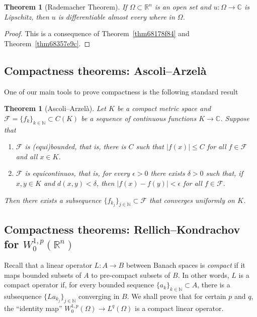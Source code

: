 \documentclass[a4paper,9pt]{amsart}
\newcommand{\scr}[1]{\mathscr{#1}}
\newcommand{\N}{\mathbb{N}}	%
\newcommand{\R}{\mathbb{R}}	%
\newcommand{\C}{\mathbb{C}}	%
\theoremstyle{plain}
\newtheorem{theorem}[proposition]{Theorem}
\theoremstyle{definition}
\theoremstyle{remark}
\begin{document}
\begin{theorem}[Rademacher Theorem]
	If $\Omega\subset\R^n$ is an open set and $u:\Omega\to\C$ is Lipschitz,
	then $u$ is differentiable almost every where in $\Omega$.
\end{theorem}
\begin{proof}
	This is a consequence of Theorem~\ref{thm68178f84} and Theorem~\ref{thm68357e9c}.
\end{proof}


\subsection{Compactness theorems: Ascoli--Arzelà}
One of our main tools to prove compactness is the following standard result
\begin{theorem}[Ascoli--Arzelà]\label{thm681f9a96}
	Let $K$ be a compact metric space and $\scr F = \{f_k\}_{k\in\N}\subset C(K)$ be a sequence of continuous functions $K\to\C$.
	Suppose that
	\begin{enumerate}
	\item
	$\scr F$ is (equi)bounded, that is, there is $C$ such that $|f(x)| \le C$ for all $f\in\scr F$ and all $x\in K$.
	\item
	$\scr F$ is equicontinuos, that is, for every $\epsilon>0$ there exists $\delta>0$ such that, if $x,y\in K$ and $d(x,y)<\delta$, then $|f(x)-f(y)|<\epsilon$ for all $f\in\scr F$.
	\end{enumerate}
	Then there exists a subsequence $\{f_{k_j}\}_{j\in\N}\subset\scr F$ that converges uniformly on $K$.
\end{theorem}

\subsection{Compactness theorems: Rellich--Kondrachov for $W^{1,p}_0(\R^n)$}

Recall that a linear operator $L:A\to B$ between Banach spaces is \emph{compact} if it maps bounded subsets of $A$ to pre-compact subsets of $B$.
In other words, $L$ is a compact operator if, for every bounded sequence $\{a_k\}_{k\in\N}\subset A$, there is a subsequence $\{La_{k_j}\}_{j\in\N}$ converging in $B$.
We shall prove that for certain $p$ and $q$, the ``identity map'' $W^{1,p}_0(\Omega) \to L^q(\Omega)$ is a compact linear operator.
\end{document}
